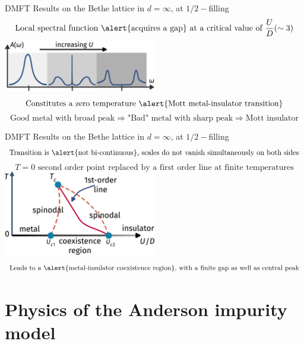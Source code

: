 \documentclass[11pt,aspectratio=169]{beamer}
\begin{document}
\begin{frame}{DMFT Results on the Bethe lattice in \(d=\infty\), at \(1/2-\)filling}
\[\text{Local spectral function \alert{acquires a gap} at a critical value of \(\frac{U}{D} (\sim 3)\)}\]
\includegraphics[width=0.5\textwidth]{dmft-sf.pdf}
\[\text{Constitutes a zero temperature \alert{Mott metal-insulator transition}}\]
\[\text{Good metal with broad peak}\Rightarrow\text{"Bad" metal with sharp peak}\Rightarrow\text{Mott insulator}\]
\end{frame}

\begin{frame}{DMFT Results on the Bethe lattice in \(d=\infty\), at \(1/2-\)filling}
\[\text{Transition is \alert{not bi-continuous}, scales do not vanish simultaneously on both sides}\]
\[\text{\(T=0\) second order point replaced by a first order line at finite temperatures}\]
\includegraphics[width=0.5\textwidth]{coexistence-dmft.pdf}
\[\text{Leads to a \alert{metal-insulator coexistence region}, with a finite gap as well as central peak}\]
\end{frame}

\section{Physics of the Anderson impurity model}
\end{document}
